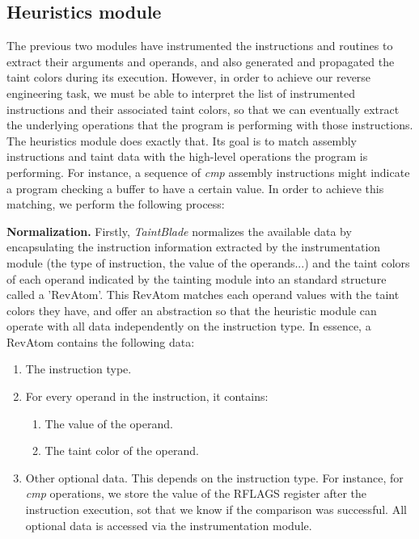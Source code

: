 \documentclass[conference]{IEEEtran}
\begin{document}

\subsection{Heuristics module}
The previous two modules have instrumented the instructions and routines to
extract their arguments and operands, and also generated and propagated the
taint colors during its execution. However, in order to achieve our reverse
engineering task, we must be able to interpret the list of instrumented
instructions and their associated taint colors, so that we can eventually
extract the underlying operations that the program is performing with those
instructions. The heuristics module does exactly that. Its goal is to match
assembly instructions and taint data with the high-level operations the program
is performing. For instance, a sequence of \textit{cmp} assembly instructions
might indicate a program checking a buffer to have a certain value. In order to
achieve this matching, we perform the following process:

\textbf{Normalization.}
Firstly, \textit{TaintBlade} normalizes the available data by encapsulating the instruction information
extracted by the instrumentation module (the type of instruction, the value of the operands...) and the
taint colors of each operand indicated by the tainting module into an standard structure called a 'RevAtom'.
This RevAtom matches each operand values with the taint colors they have, and offer an abstraction
so that the heuristic module can operate with all data independently on the instruction type. In essence,
a RevAtom contains the following data:

\begin{enumerate}
    \item The instruction type.
    \item For every operand in the instruction, it contains:
          \begin{enumerate}
              \item The value of the operand.
              \item The taint color of the operand.
          \end{enumerate}
    \item Other optional data. This depends on the instruction type. For instance, for
          \textit{cmp} operations, we store the value of the RFLAGS register after the
          instruction execution, sot that we know if the comparison was successful. All
          optional data is accessed via the instrumentation module.
\end{enumerate}
\end{document}
